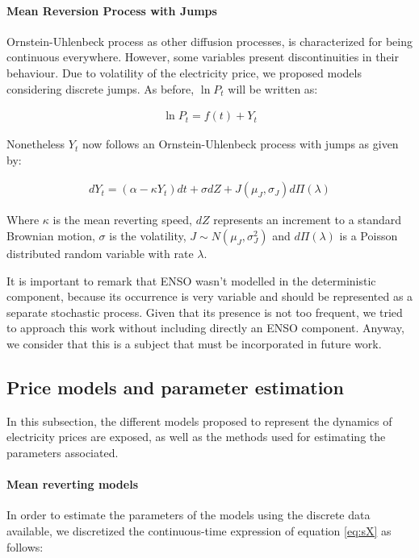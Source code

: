 \documentclass[3p]{elsarticle}
\begin{document}
\paragraph{Mean Reversion Process with Jumps}
Ornstein-Uhlenbeck process as other diffusion processes, is characterized for being continuous everywhere. However, some variables present discontinuities in their behaviour. Due to volatility of the electricity price, we proposed models considering discrete jumps. As before, $\ln P_t$ will be written as:

\begin{align}
\label{eq:slnP2}
\ln P_t=f(t)+Y_t
\end{align}

Nonetheless $Y_t$ now follows an Ornstein-Uhlenbeck process with jumps as \cite{Cartea} given by:

\begin{align}
\label{eq:slnPJ}
dY_t=(\alpha -\kappa Y_t)dt+\sigma dZ+J(\mu_J,\sigma_J) d\Pi(\lambda)
\end{align}

Where $\kappa$ is the mean reverting speed, $dZ$ represents an increment to a standard Brownian motion, $\sigma$ is the volatility, $J\sim N(\mu_J,\sigma^2_J)$ and $d\Pi(\lambda)$ is a Poisson distributed random variable with rate $\lambda$.

It is important to remark that ENSO wasn't modelled in the deterministic component, because its occurrence is very variable and should be represented as a separate stochastic process. Given that its presence is not too frequent, we tried to approach this work without including directly an ENSO component.  Anyway, we consider that this is a subject that must be incorporated in future work.

\subsection{Price models and parameter estimation}
In this subsection, the different models proposed to represent the dynamics of electricity prices are exposed, as well as the methods used for estimating the parameters associated.

\paragraph{Mean reverting models}
In order to estimate the parameters of the models using the discrete data available, we discretized the continuous-time expression of equation \ref{eq:sX} as follows:
\end{document}
